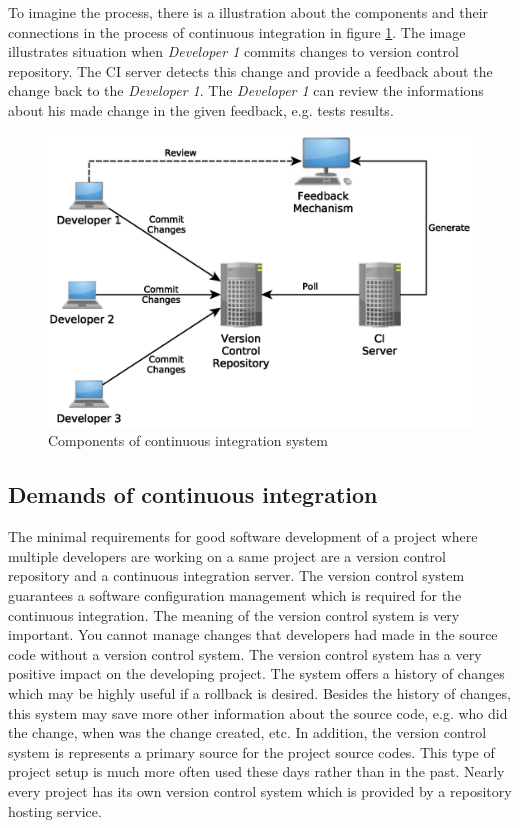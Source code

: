 To imagine the process, there is a illustration about the components and their connections in the process of continuous integration in figure \ref{fig:cocis}. The image illustrates situation when \textit{Developer 1} commits changes to version control repository. The CI server detects this change and provide a feedback about the change back to the \textit{Developer 1}. The \textit{Developer 1} can review the informations about his made change in the given feedback, e.g. tests results.

\begin{figure}[H]
	\centering
	\includegraphics[scale=0.6]{yEd/components_of_CI_system.eps}
	\caption{Components of continuous integration system\cite{CI}}
	\label{fig:cocis}
\end{figure}

\subsection{Demands of continuous integration}
The minimal requirements for good software development of a project where multiple developers are working on a same project are a version control repository and a continuous integration server. The version control system guarantees a software configuration management which is required for the continuous integration. The meaning of the version control system is very important. You cannot manage changes that developers had made in the source code without a version control system. The version control system has a very positive impact on the developing project. The system offers a history of changes which may be highly useful if a rollback is desired. Besides the history of changes, this system may save more other information about the source code, e.g. who did the change, when was the change created, etc. In addition, the version control system is represents a primary source for the project source codes. This type of project setup is much more often used these days rather than in the past. Nearly every project has its own version control system which is provided by a repository hosting service.\\

